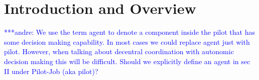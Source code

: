 \documentclass[conference,final]{IEEEtran}
\newcommand{\jhanote}[1]{ {\textcolor{red} { ***shantenu: #1 }}}
\newcommand{\alnote}[1]{ {\textcolor{blue} { ***andre: #1 }}}
\newcommand{\note}[1]{ {\textcolor{magenta} { ***Note: #1 }}}
\newcommand{\alnote}[1]{}
\newcommand{\jhanote}[1]{}
\newcommand{\note}[1]{}
\newcommand{\upp}{\vspace*{-0.5em}}
\begin{document}

\section{Introduction and Overview \upp\upp}

\alnote{We use the term agent to denote a component inside the pilot
  that has some decision making capability. In most cases we could
  replace agent just with pilot. However, when talking about decentral
  coordination with autonomic decision making this will be
  difficult. Should we explicitly define an agent in sec II under
  Pilot-Job (aka pilot)?}
 
\end{document}
